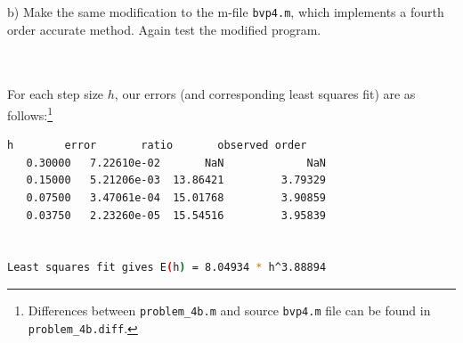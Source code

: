 \pagebreak
b) Make the same modification to the m-file \texttt{bvp4.m}, which implements a fourth order accurate method. Again test
   the modified program.

\begin{solution}\ \\\\
   For each step size $h$, our errors (and corresponding least squares fit) are as follows:\footnote{
      Differences between \texttt{problem\_4b.m} and source \texttt{bvp4.m} file can be found in
      \texttt{problem\_4b.diff}. 
   }\\
     
   \begin{lstlisting}[language=bash, basicstyle=\tiny]
      h        error       ratio       observed order
   0.30000   7.22610e-02       NaN             NaN
   0.15000   5.21206e-03  13.86421         3.79329
   0.07500   3.47061e-04  15.01768         3.90859
   0.03750   2.23260e-05  15.54516         3.95839
 
 
Least squares fit gives E(h) = 8.04934 * h^3.88894
   \end{lstlisting}


\end{solution}

